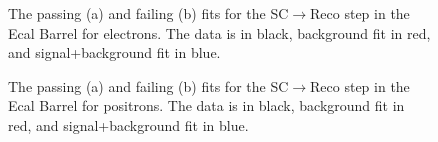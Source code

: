 \begin{thebibliography}{10}
\begin{figure}[htb]
  \begin{center}
    \caption{The passing (a) and failing (b) fits for the SC$\to$Reco step in the Ecal Barrel for electrons.
             The data is in black, background fit in red, and signal+background fit in blue.}
  \end{center}
\end{figure}

\begin{figure}[htb]
  \begin{center}
    \caption{The passing (a) and failing (b) fits for the SC$\to$Reco step in the Ecal Barrel for positrons.
             The data is in black, background fit in red, and signal+background fit in blue.}
  \label{fig:scRecoEbPlus}  
  \end{center}
\end{figure}


\end{thebibliography}
